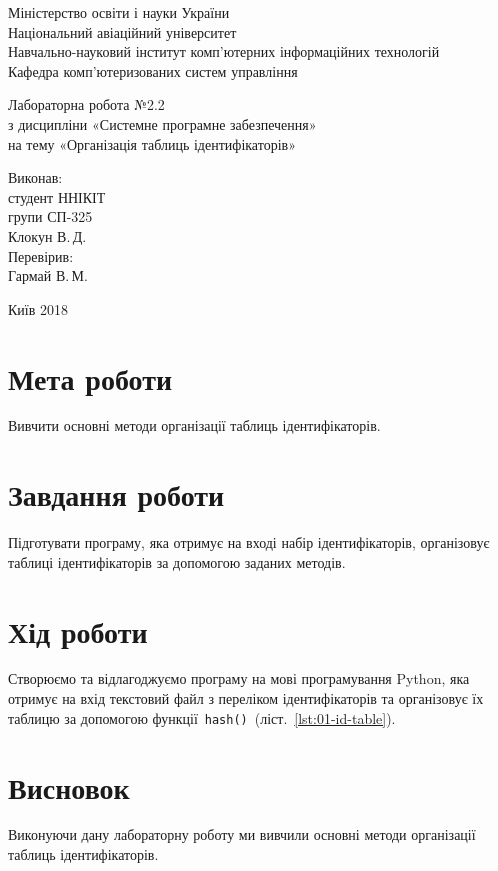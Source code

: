 \documentclass[
	a4paper,
	oneside,
	BCOR = 10mm,
	DIV = 12,
	12pt,
	headings = normal,
]{scrartcl}
\newcommand{\allcaps}[1]{{\addfontfeatures{LetterSpace = 8, Kerning = Off}#1}}
\begin{document}
\begin{titlepage}
		\begin{center}
			Міністерство освіти і науки України\\
			Національний авіаційний університет\\
			Навчально-науковий інститут комп'ютерних інформаційних технологій\\
			Кафедра комп'ютеризованих систем управління

			\vspace{\fill}
				Лабораторна робота №2.2\\
				з дисципліни «Системне програмне забезпечення»\\
				на тему «Організація таблиць ідентифікаторів»\\

			\vspace{\fill}

			\begin{flushright}
				Виконав:\\
				студент \allcaps{ННІКІТ}\\
				групи СП-325\\
				Клокун В.\,Д.\\
				Перевірив:\\
				Гармай В.\,М.
			\end{flushright}

			Київ 2018
		\end{center}
	\end{titlepage}

	\section{Мета роботи}
		Вивчити основні методи організації таблиць ідентифікаторів.

	\section{Завдання роботи}
		Підготувати програму, яка отримує на вході набір ідентифікаторів, організовує таблиці ідентифікаторів за допомогою заданих методів.

	\section{Хід роботи}
		Створюємо та відлагоджуємо програму на мові програмування \textenglish{Python}, яка отримує на вхід текстовий файл з переліком ідентифікаторів та організовує їх таблицю за допомогою функції~\texttt{hash()}~(ліст.~\ref{lst:01-id-table}).


	\section{Висновок}
		Виконуючи дану лабораторну роботу ми вивчили основні методи організації таблиць ідентифікаторів.
\end{document}
